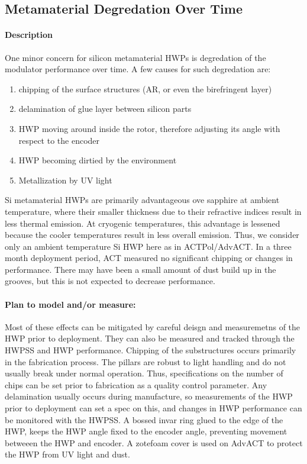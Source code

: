 \subsection{Metamaterial Degredation Over Time}

\paragraph{Description} 

One minor concern for silicon metamaterial HWPs is degredation of the modulator performance over time.  A few causes for such degredation are:

\begin{enumerate}
	\item chipping of the surface structures (AR, or even the birefringent layer)
	\item delamination of glue layer between silicon parts
	\item HWP moving around inside the rotor, therefore adjusting its angle with respect to the encoder
	\item HWP becoming dirtied by the environment
	\item Metallization by UV light
\end{enumerate}

Si metamaterial HWPs are primarily advantageous ove sapphire at ambient temperature, where their smaller thickness due to their refractive indices result in less thermal emission. At cryogenic temperatures, this advantage is lessened because the cooler temperatures result in less overall emission. Thus, we consider only an ambient temperature Si HWP here as in ACTPol/AdvACT. In a three month deployment period, ACT measured no significant chipping or changes in performance.  There may have been a small amount of dust build up in the grooves, but this is not expected to decrease performance.
  
\paragraph{Plan to model and/or measure:}
Most of these effects can be mitigated by careful deisgn and measuremetns of the HWP prior to deployment. They can also be measured and tracked through the HWPSS and HWP performance. Chipping of the substructures occurs primarily in the fabrication process. The pillars are robust to light handling and do not usually break under normal operation. Thus, specifications on the number of chips can be set prior to fabrication as a quality control parameter. Any delamination usually occurs during manufacture, so measurements of the HWP prior to deployment can set a spec on this, and changes in HWP performance can be monitored with the HWPSS. A bossed invar ring glued to the edge of the HWP, keeps the HWP angle fixed to the encoder angle, preventing movement betweeen the HWP and encoder. A zotefoam cover is used on AdvACT to protect the HWP from UV light and dust.

